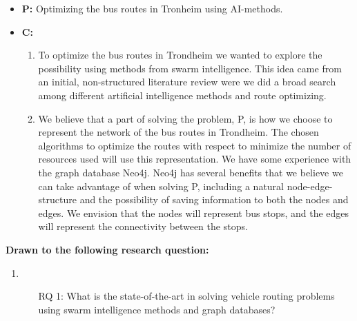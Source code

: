 \begin{itemize}
\item \textbf{P:} Optimizing the bus routes in Tronheim using AI-methods. %
\item \textbf{C:} 
    \begin{enumerate}
        \item To optimize the bus routes in Trondheim we wanted to explore the possibility using methods from swarm intelligence. This idea came from an initial, non-structured literature review were we did a broad search among different artificial intelligence methods and route optimizing. %
        \item We believe that a part of solving the problem, P, is how we choose to represent the network of the bus routes in Trondheim. The chosen algorithms to optimize the routes with respect to minimize the number of resources used will use this representation. We have some experience with the graph database Neo4j. Neo4j has several benefits that we believe we can take advantage of when solving P, including a natural node-edge-structure and the possibility of saving information to both the nodes and edges. We envision that the nodes will represent bus stops, and the edges will represent the connectivity between the stops. 
    \end{enumerate}
\end{itemize}

\textbf{Drawn to the following research question:}

\begin{enumerate}[label=\textbf{\arabic*})]
\item 
    \begin{enumerate}
    \item[RQ 1:] What is the state-of-the-art in solving vehicle routing problems using swarm intelligence methods and graph databases?
    \end{enumerate}
\end{enumerate}

